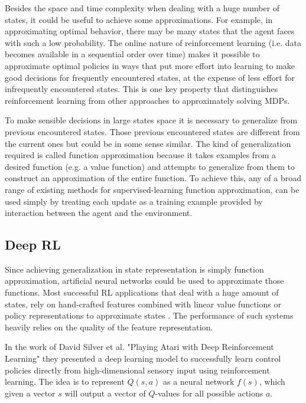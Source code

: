 \documentclass{article}
\begin{document}
Besides the space and time complexity when dealing with a huge number of states, it could be useful to achieve some approximations. For example, in approximating optimal behavior, there may be many states that the agent faces with such a low probability. The online nature of reinforcement learning (i.e. data becomes available in a sequential order over time) makes it possible to approximate optimal policies in ways that put more effort into learning to make good decisions for frequently encountered states, at the expense of less effort for infrequently encountered states. This is one key property that distinguishes reinforcement learning from other approaches to approximately solving MDPs.

To make sensible decisions in large states space it is necessary to generalize from previous encountered states. Those previous encountered states are different from the current ones but could be in some sense similar. The kind of generalization required is called function approximation because it takes examples from a desired function (e.g. a value function) and attempts to generalize from them to construct an approximation of the entire function. To achieve this, any of a broad range of existing methods for supervised-learning function approximation, can be used simply by treating each update as a training example provided by interaction between the agent and the environment.

\subsection{ Deep RL}
Since achieving generalization in state representation is simply function approximation, artificial neural networks could be used to approximate those functions. 
Most successful RL applications that deal with a huge amount of states, rely on hand-crafted features combined with linear value functions or policy representations to approximate states \cite{mnih2013atari}. The performance of such systems heavily relies on the quality of the feature representation.

In the work of David Silver et al. "Playing Atari with Deep Reinforcement Learning" \cite{mnih2013atari} they presented a deep learning model to successfully learn control policies directly from high-dimensional sensory input using reinforcement learning. The idea is to represent $Q(s,a)$ as a neural network  $f(s)$, which given a vector $s$ will output a vector of $Q$-values for all possible actions $a$.
\end{document}
